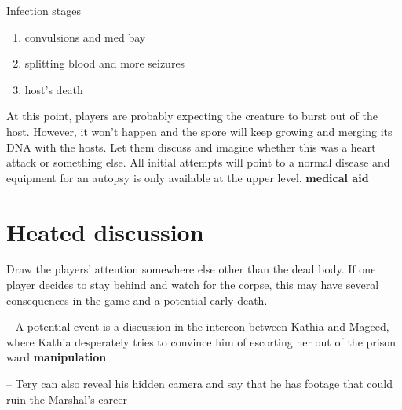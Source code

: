 \begin{rpg-commentbox}{Infection stages}
    \begin{enumerate}
        \item convulsions and med bay
        \item splitting blood and more seizures
        \item host's death
    \end{enumerate}

    At this point, players are probably expecting the creature to burst out of the host. However, it won't happen and the spore will keep growing and merging its DNA with the hosts. Let them discuss and imagine whether this was a heart attack or something else. All initial attempts will point to a normal disease and equipment for an autopsy is only available at the upper level.  \textbf{medical aid}

\end{rpg-commentbox}





\newsect

\section{Heated discussion}


\begin{rpg-commentbox}{}
    
    Draw the players' attention somewhere else other than the dead body. If one player decides to stay behind and watch for the corpse, this may have several consequences in the game and a potential early death.
    
    -- A potential event is a discussion in the intercon between Kathia and Mageed, where Kathia desperately tries to convince him of escorting her out of the prison ward \textbf{manipulation}
    
    -- Tery can also reveal his hidden camera and say that he has footage that could ruin the Marshal's career

\end{rpg-commentbox}

\newsect



